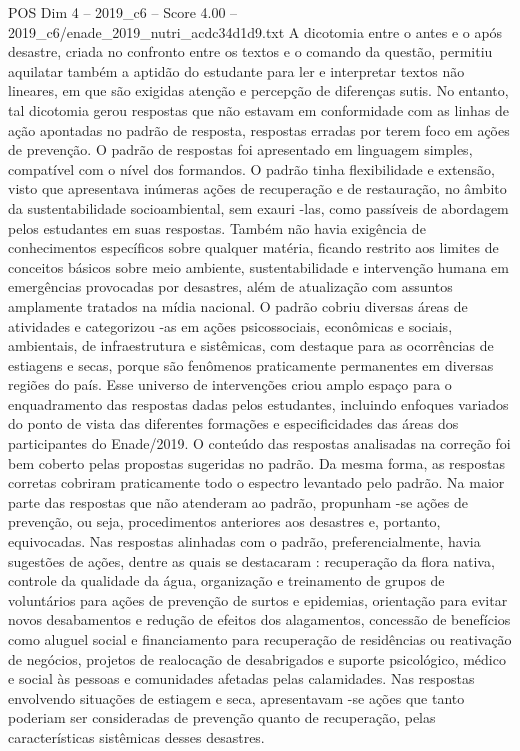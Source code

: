 \begin{textsample}{POS Dim 4 – 2019\_c6 – Score 4.00 – 2019\_c6/enade\_2019\_nutri\_acdc34d1d9.txt}
A dicotomia entre o antes e o após desastre, criada no confronto entre os textos e o comando da questão, permitiu aquilatar também a aptidão do estudante para ler e interpretar textos não lineares, em que são exigidas atenção e percepção de diferenças sutis.
No entanto, tal dicotomia gerou respostas que não estavam em conformidade com as linhas de ação apontadas no padrão de resposta, respostas erradas por terem foco em ações de prevenção.
O padrão de respostas foi apresentado em linguagem simples, compatível com o nível dos formandos.
O padrão tinha flexibilidade e extensão, visto que apresentava inúmeras ações de recuperação e de restauração, no âmbito da sustentabilidade socioambiental, sem exauri -las, como passíveis de abordagem pelos estudantes em suas respostas.
Também não havia exigência de conhecimentos específicos sobre qualquer matéria, ficando restrito aos limites de conceitos básicos sobre meio ambiente, sustentabilidade e intervenção humana em emergências provocadas por desastres, além de atualização com assuntos amplamente tratados na mídia nacional.
O padrão cobriu diversas áreas de atividades e categorizou -as em ações psicossociais, econômicas e sociais, ambientais, de infraestrutura e sistêmicas, com destaque para as ocorrências de estiagens e secas, porque são fenômenos praticamente permanentes em diversas regiões do país.
Esse universo de intervenções criou amplo espaço para o enquadramento das respostas dadas pelos estudantes, incluindo enfoques variados do ponto de vista das diferentes formações e especificidades das áreas dos participantes do Enade/2019.
O conteúdo das respostas analisadas na correção foi bem coberto pelas propostas sugeridas no padrão.
Da mesma forma, as respostas corretas cobriram praticamente todo o espectro levantado pelo padrão.
Na maior parte das respostas que não atenderam ao padrão, propunham -se ações de prevenção, ou seja, procedimentos anteriores aos desastres e, portanto, equivocadas.
Nas respostas alinhadas com o padrão, preferencialmente, havia sugestões de ações, dentre as quais se destacaram : recuperação da flora nativa, controle da qualidade da água, organização e treinamento de grupos de voluntários para ações de prevenção de surtos e epidemias, orientação para evitar novos desabamentos e redução de efeitos dos alagamentos, concessão de benefícios como aluguel social e financiamento para recuperação de residências ou reativação de negócios, projetos de realocação de desabrigados e suporte psicológico, médico e social às pessoas e comunidades afetadas pelas calamidades.
Nas respostas envolvendo situações de estiagem e seca, apresentavam -se ações que tanto poderiam ser consideradas de prevenção quanto de recuperação, pelas características sistêmicas desses desastres.

\end{textsample}

